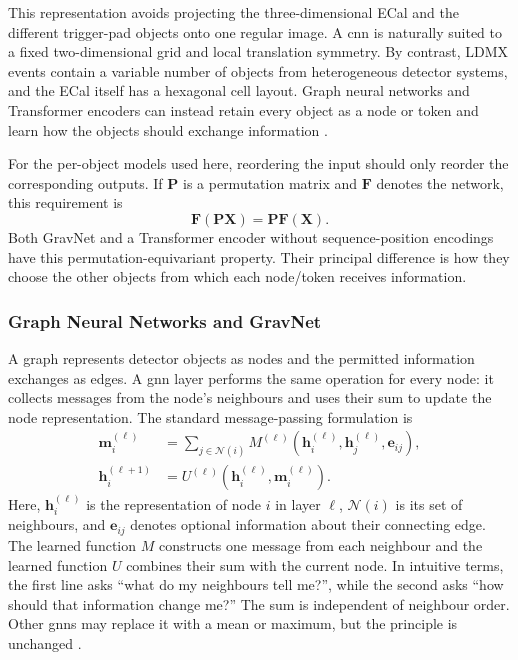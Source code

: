 This representation avoids projecting the three-dimensional ECal and the
different trigger-pad objects onto one regular image. A \gls{cnn} is naturally
suited to a fixed two-dimensional grid and local translation symmetry. By
contrast, LDMX events contain a variable number of objects from heterogeneous
detector systems, and the ECal itself has a hexagonal cell layout. Graph
neural networks and Transformer encoders can instead retain every object as a
node or token and learn how the objects should exchange information
\cite{duarte2020-gnn-tracking,lee2019-set-transformer}.

For the per-object models used here, reordering the input should only reorder
the corresponding outputs. If \(\mathbf{P}\) is a permutation matrix and
\(\mathbf{F}\) denotes the network, this requirement is
\begin{equation}
    \mathbf{F}(\mathbf{P}\mathbf{X})
    =
    \mathbf{P}\mathbf{F}(\mathbf{X}).
\end{equation}
Both GravNet and a Transformer encoder without sequence-position encodings
have this permutation-equivariant property. Their principal difference is
how they choose the other objects from which each node/token receives
information.







\subsubsection{Graph Neural Networks and GravNet}
\label{sec:gnn_gravnet_background}

A graph represents detector objects as nodes and the permitted information
exchanges as edges. A \gls{gnn} layer performs the same operation for every node: it
collects messages from the node's neighbours and uses their sum to update the
node representation. The standard message-passing formulation is
\begin{align}
    \mathbf{m}_i^{(\ell)}
    &=
    \sum_{j\in\mathcal{N}(i)}
    M^{(\ell)}\!\left(
        \mathbf{h}_i^{(\ell)},
        \mathbf{h}_j^{(\ell)},
        \mathbf{e}_{ij}
    \right),
    \label{eq:generic_message}\\
    \mathbf{h}_i^{(\ell+1)}
    &=
    U^{(\ell)}\!\left(
        \mathbf{h}_i^{(\ell)},
        \mathbf{m}_i^{(\ell)}
    \right).
    \label{eq:generic_update}
\end{align}
Here, \(\mathbf{h}_i^{(\ell)}\) is the representation of node \(i\) in layer
\(\ell\), \(\mathcal{N}(i)\) is its set of neighbours, and
\(\mathbf{e}_{ij}\) denotes optional information about their connecting edge.
The learned function \(M\) constructs one message from each neighbour and the
learned function \(U\) combines their sum with the current node. In intuitive
terms, the first line asks ``what do my neighbours tell me?'', while the second
asks ``how should that information change me?'' The sum is independent of
neighbour order. Other \gls{gnn}s may replace it with a mean or maximum, but the
principle is unchanged \cite{gilmer2017-message-passing,duarte2020-gnn-tracking}.

